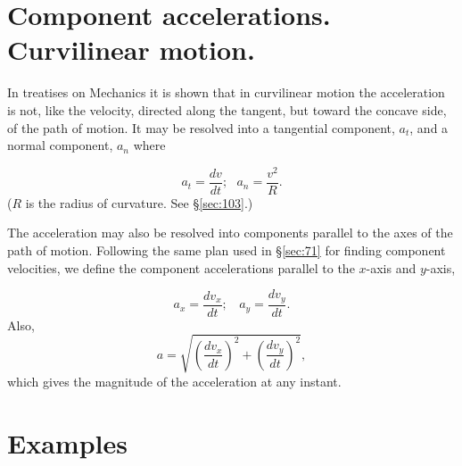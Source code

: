 \section{Component accelerations. Curvilinear motion.} 

In treatises on Mechanics it is shown that in curvilinear 
motion the acceleration is not, like the velocity, directed 
along the tangent, but toward the concave side, of the path of 
motion. It may be resolved into a tangential component, 
$a_t$, and a normal component, $a_n$ where

\begin{equation}
a_t = \frac{dv}{dt};\ \ \  a_n = \frac{v^2}{R}.
\label{eqn:14a-73}
\end{equation}
($R$ is the radius of curvature. See \S \ref{sec:103}.) %

The acceleration may also be resolved into components parallel 
to the axes of the path of motion. Following the same plan used in 
\S \ref{sec:71} %
for finding component velocities, we define the component 
accelerations parallel to the $x$-axis and $y$-axis,

\begin{equation}
a_x = \frac{dv_x}{dt}; \ \ \ \ a_y = \frac{dv_y}{dt}. 
\label{eqn:15-73}
\end{equation}
Also,
\begin{equation}
a = \sqrt{\left ( \frac{dv_x}{dt} \right )^2 + \left ( \frac{dv_y}{dt} \right )^2},
\label{eqn:16-73}
\end{equation}
which gives the magnitude of the acceleration at any instant.

\section{Examples}

